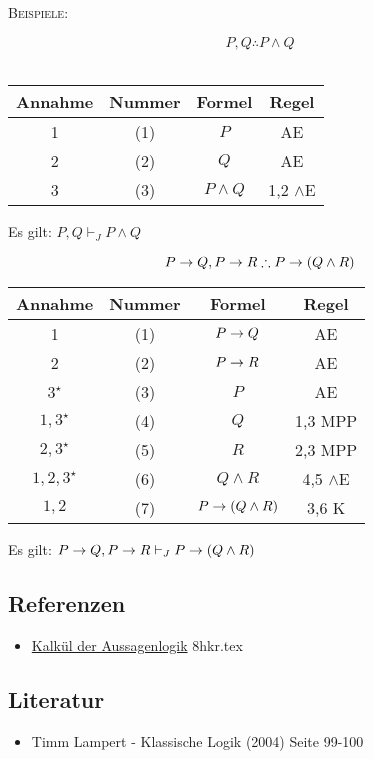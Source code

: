 \documentclass{sajzk}
\begin{document}
\textsc{Beispiele:}
\begin{center}
    \[P, Q \therefore P \land Q\] \\
\begin{tabular}{|c|c|c|c|}
  \hline
  Annahme            & Nummer & Formel       & Regel \\
  \hline
  1                  & (1)    & $P$          & AE \\
  \hline
  2                  & (2)    & $Q$          & AE \\
  \hline
  3                  & (3)    & $P \land Q$  & 1,2 $\land$E \\
  \hline
\end{tabular}
\end{center}
Es gilt: $P, Q \vdash_J P \land Q$
\newpage
\begin{center}
    \[P \rightarrow Q, P \rightarrow R \therefore P \rightarrow (Q\land R)\]
\begin{tabular}{|c|c|c|c|}
  \hline
  Annahme            & Nummer & Formel                 & Regel \\
  \hline
  1                  & (1)    & $P \rightarrow Q$              & AE \\
  \hline
  2                  & (2)    & $P \rightarrow R$              & AE \\
  \hline
  $3^\star$          & (3)    & $P$                    & AE \\
  \hline
  $1, 3^\star$       & (4)    & $Q$                    & 1,3 MPP \\
  \hline
  $2, 3^\star$       & (5)    & $R$                    & 2,3 MPP \\
  \hline
  $1, 2, 3^\star$    & (6)    & $Q \land R$            & 4,5 $\land$E \\
  \hline
  $1, 2$             & (7)    & $P \rightarrow (Q \land R)$    & 3,6 K \\
  \hline
\end{tabular}
\end{center}
Es gilt: $P \rightarrow Q, P \rightarrow R \vdash_J P \rightarrow (Q\land R)$
\subsection{Referenzen}
\begin{itemize}
    \item \href{8hkr.pdf}{Kalkül der Aussagenlogik} 8hkr.tex
\end{itemize}

\subsection{Literatur}
\begin{itemize}
    \item Timm Lampert - Klassische Logik (2004) Seite 99-100
\end{itemize}
\end{document}
